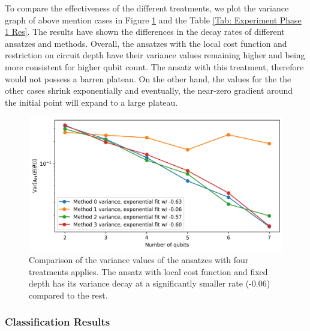 To compare the effectiveness of the different treatments, we plot the variance graph of above mention cases in Figure \ref{Fig: Plot Variances} and the Table \ref{Tab: Experiment Phase 1 Res}.
The results have shown the differences in the decay rates of different ansatzes and methods.
Overall, the ansatzes with the local cost function and restriction on circuit depth have their variance values remaining higher and being more consistent for higher qubit count.
The ansatz with this treatment, therefore would not possess a barren plateau.
On the other hand, the values for the the other cases shrink exponentially and eventually, the near-zero gradient around the initial point will expand to a large plateau.


\begin{figure}
    \includegraphics[width=\textwidth]{Artefact/Appendices/variances.png}
    \caption{
        Comparison of the variance values of the ansatzes with four treatments applies.
        The ansatz with local cost function and fixed depth has its variance decay at a significantly smaller rate (-0.06) compared to the rest.
    }
    \label{Fig: Plot Variances}
\end{figure}


\subsubsection{Classification Results}

